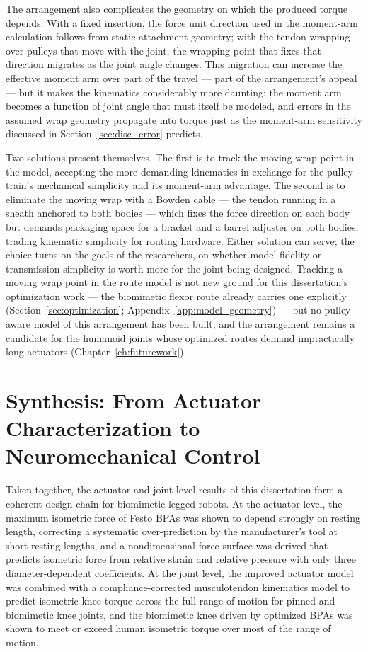 The arrangement also complicates the geometry on which the produced torque depends. With a fixed insertion, the force unit direction used in the moment-arm calculation follows from static attachment geometry; with the tendon wrapping over pulleys that move with the joint, the wrapping point that fixes that direction migrates as the joint angle changes. This migration can increase the effective moment arm over part of the travel --- part of the arrangement's appeal --- but it makes the kinematics considerably more daunting: the moment arm becomes a function of joint angle that must itself be modeled, and errors in the assumed wrap geometry propagate into torque just as the moment-arm sensitivity discussed in Section~\ref{sec:disc_error} predicts.

Two solutions present themselves. The first is to track the moving wrap point in the model, accepting the more demanding kinematics in exchange for the pulley train's mechanical simplicity and its moment-arm advantage. The second is to eliminate the moving wrap with a Bowden cable --- the tendon running in a sheath anchored to both bodies --- which fixes the force direction on each body but demands packaging space for a bracket and a barrel adjuster on both bodies, trading kinematic simplicity for routing hardware. Either solution can serve; the choice turns on the goals of the researchers, on whether model fidelity or transmission simplicity is worth more for the joint being designed. Tracking a moving wrap point in the route model is not new ground for this dissertation's optimization work --- the biomimetic flexor route already carries one explicitly (Section~\ref{sec:optimization}; Appendix~\ref{app:model_geometry}) --- but no pulley-aware model of this arrangement has been built, and the arrangement remains a candidate for the humanoid joints whose optimized routes demand impractically long actuators (Chapter~\ref{ch:futurework}).

\section{Synthesis: From Actuator Characterization to Neuromechanical Control}\label{sec:synthesis}

Taken together, the actuator and joint level results of this dissertation form a coherent design chain for biomimetic legged robots. At the actuator level, the maximum isometric force of Festo BPAs was shown to depend strongly on resting length, correcting a systematic over-prediction by the manufacturer's tool at short resting lengths, and a nondimensional force surface was derived that predicts isometric force from relative strain and relative pressure with only three diameter-dependent coefficients. At the joint level, the improved actuator model was combined with a compliance-corrected musculotendon kinematics model to predict isometric knee torque across the full range of motion for pinned and biomimetic knee joints, and the biomimetic knee driven by optimized BPAs was shown to meet or exceed human isometric torque over most of the range of motion.


